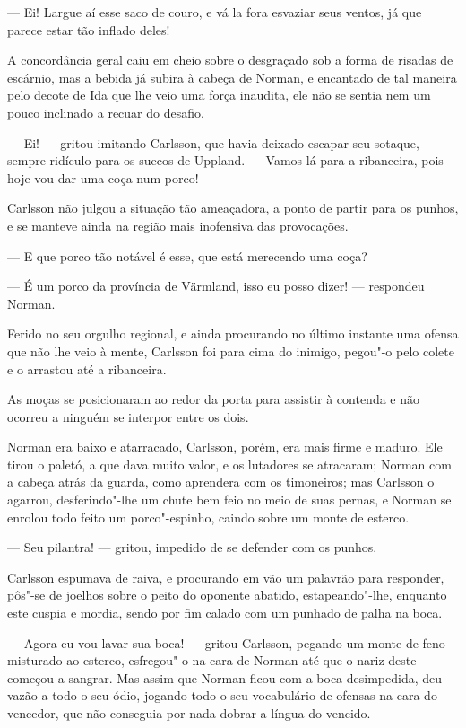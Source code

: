 --- Ei! Largue aí esse saco de couro, e vá la fora esvaziar seus ventos, já que
parece estar tão inflado deles!

A concordância geral caiu em cheio sobre o desgraçado sob a forma de risadas de
escárnio, mas a bebida já subira à cabeça de Norman, e encantado de tal maneira 
pelo decote de Ida que lhe veio uma força inaudita, ele não se sentia nem um 
pouco inclinado a recuar do desafio.

--- Ei! --- gritou imitando Carlsson, que havia deixado escapar seu sotaque,
sempre ridículo para os suecos de Uppland. --- Vamos lá para a ribanceira, pois
hoje vou dar uma coça num porco!

Carlsson não julgou a situação tão ameaçadora, a ponto de partir para os punhos,
e se manteve ainda na região mais inofensiva das provocações.

--- E que porco tão notável é esse, que está merecendo uma coça?

--- É um porco da província de Värmland, isso eu posso dizer! --- respondeu Norman.

Ferido no seu orgulho regional, e ainda procurando no último instante uma ofensa
que não lhe veio à mente, Carlsson foi para cima do inimigo, pegou"-o pelo colete e o
arrastou até a ribanceira.

As moças se posicionaram ao redor da porta para assistir à contenda e não
ocorreu a ninguém se interpor entre os dois.

Norman era baixo e atarracado, Carlsson, porém, era mais firme e maduro. Ele
tirou o paletó, a que dava muito valor, e os lutadores se atracaram; Norman com
a cabeça atrás da guarda, como aprendera com os timoneiros; mas Carlsson o
agarrou, desferindo"-lhe um chute bem feio no meio de suas pernas, e Norman se
enrolou todo feito um porco"-espinho, caindo sobre um monte de esterco.

--- Seu pilantra! --- gritou, impedido de se defender com os punhos.

Carlsson espumava de raiva, e procurando em vão um palavrão para responder,
pôs"-se de joelhos sobre o peito do oponente abatido, estapeando"-lhe, enquanto este
cuspia e mordia, sendo por fim calado com um punhado de palha na boca.

--- Agora eu vou lavar sua boca! --- gritou Carlsson, pegando um monte de feno misturado ao esterco,
esfregou"-o na cara de Norman até que o nariz deste começou a sangrar. Mas assim que Norman
ficou com a boca desimpedida, deu vazão a todo o seu ódio, jogando
todo o seu vocabulário de ofensas na cara do vencedor, que não conseguia por nada 
dobrar a língua do vencido.


